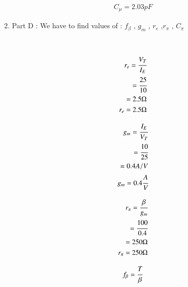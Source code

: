 \begin{enumerate}[label=\thesubsection.\arabic*.,ref=\thesubsection.\theenumi]
\begin{align}
      C_{\mu} = 2.03 pF 
    
\end{align}
    


\item
Part D : We have to find values of :
 $f_{\beta}$ , $g_{m}$ , $r_{e}$ ,$r_{\pi}$ , $C_{\pi}$
 
\\
  
 \solution

\begin{align}

        r_{e} = \cfrac{V_{T}}{I_{E}}\\
              
              = \cfrac{25}{10}\\
              
              = 2.5 \ohm\\
 
        r_{e} = 2.5 \ohm
      
\end{align}

\begin{align}

       g_{m} = \cfrac{I_{E}}{V_{T}}\\
            
            = \cfrac{10}{25}\\
            
            = 0.4 A/V\\
        
        g_{m}= 0.4 \cfrac{A}{V}
    
\end{align}

\begin{align}

        r_{\pi} = \cfrac{\beta}{g_{m}}\\
                
                = \cfrac{100}{0.4}\\
                
                = 250\ohm\\
            
        r_{\pi} = 250\ohm
    
\end{align}     
         
\begin{align}
     
        f_{\beta} = \cfrac{{T}}{\beta}\\
                  

\end{align}
\end{enumerate}
